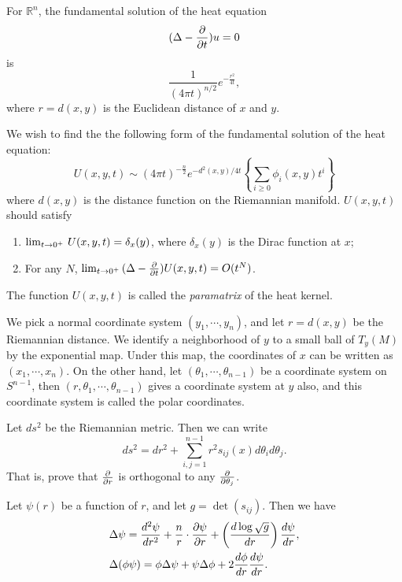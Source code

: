\medskip

\medskip

For $\mathbb R^n$, the fundamental solution of the heat equation
\[
(\Delta-\frac{\partial}{\partial t}) u=0
\]
is 
\[
\frac{1}{(4\pi t)^{n/2}}e^{-\frac{r^2}{4t}},
\]
where $r=d(x,y)$ is the Euclidean distance of $x$ and $y$.

We wish to find the the following form of the  fundamental solution of the heat equation:
\begin{equation}\label{formal}
U(x,y,t)\sim (4\pi t)^{-\frac n2} e^{-d^2(x,y)/4t}\left\{\sum_{i\geq 0}\phi_i(x,y) t^i\right\}
\end{equation}
where $d(x,y)$ is the distance function on the Riemannian manifold. $U(x,y,t)$ should satisfy 
\begin{enumerate}
\item  $\lim_{t\to 0^+}\, U(x,y,t)=\delta_x(y)$, where $\delta_x(y)$ is the Dirac  function at $x$;
\item For any $N$, $\lim_{t\to 0^+}\, (\Delta-\frac{\partial}{\partial t})U(x,y,t)=O(t^N)$.
\end{enumerate}

The function $U(x,y,t)$ is called the {\it paramatrix} of the heat kernel.

We pick a normal coordinate system 
$(y_1,\cdots,y_n)$, and let $r=d(x,y)$ be the Riemannian distance. 
We identify a neighborhood of $y$ to a small ball of $T_y(M)$ by the exponential map. Under this map, the coordinates of $x$ can be written as $(x_1,\cdots,x_n)$. On the other hand, let $(\theta_1,\cdots,\theta_{n-1})$ be a coordinate system on $S^{n-1}$, then $(r,\theta_1,\cdots,\theta_{n-1})$ gives a coordinate system at $y$ also, and this coordinate system is called the polar coordinates.


\begin{ex} Let $ds^2$ be the Riemannian metric. Then we can write
\[
ds^2=dr^2+\sum_{i,j=1}^{n-1} r^2s_{ij}(x) d\theta_i d\theta_j.
\]
That is, prove that $\frac{\partial}{\partial r}$ is orthogonal to any $\frac{\partial}{\partial\theta_j}$.
\end{ex}

Let $\psi(r)$ be a function of $r$, and let $g=\det (s_{ij})$. Then we have
\begin{align*}
& \Delta\psi=\frac{d^2\psi}{dr^2}+\frac nr\cdot\frac{\partial\psi}{\partial r}+\left(\frac{d\log \sqrt g}{dr}\right)\frac{d\psi}{dr},\\
&\Delta(\phi\psi)=\phi\Delta\psi+\psi\Delta\phi+2\frac{d\phi}{dr}\frac{d\psi}{dr}.
\end{align*}

